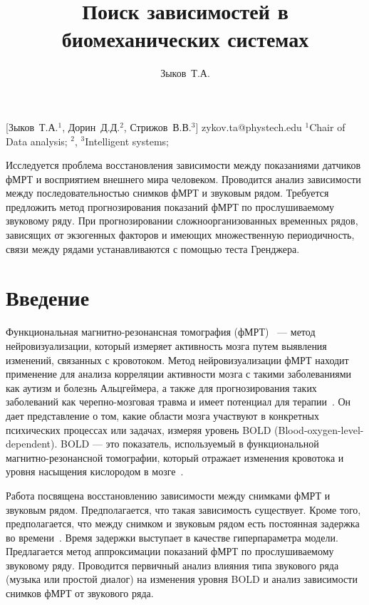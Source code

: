 \documentclass[12pt, twoside]{article}
\begin{document}
\title
    [Поиск зависимостей в биомеханических системах] %
    {Поиск зависимостей в биомеханических системах}
\author
    [Зыков Т.А.] %
    {Зыков~Т.А.} %
    [Зыков~Т.А.$^1$, Дорин~Д.Д.$^2$, Стрижов~В.В.$^{3}$] %
\email
    {zykov.ta@phystech.edu}
\organization
    {$^1$Chair of Data analysis; $^2$, $^3$Intelligent systems;}
\abstract
    {%

    
   Исследуется проблема восстановления зависимости между показаниями датчиков фМРТ и восприятием внешнего мира человеком. Проводится анализ зависимости между последовательностью снимков фМРТ и звуковым рядом. Требуется предложить метод прогнозирования показаний фМРТ по прослушиваемому звуковому ряду. При прогнозировании сложноорганизованных временных рядов, зависящих от экзогенных факторов и имеющих множественную периодичность, связи между рядами устанавливаются с помощью теста Гренджера. 
}
\maketitle

\section{Введение}

Функциональная магнитно-резонансная томография (фМРТ)~\citep{puras2014neurovisualization} — метод нейровизуализации, который измеряет активность мозга путем выявления изменений, связанных с кровотоком. Метод нейровизуализации фМРТ находит применение для анализа корреляции активности мозга с такими заболеваниями как аутизм и болезнь Альцгеймера, а также для прогнозирования таких заболеваний как черепно-мозговая травма и имеет потенциал для терапии~\citep{fmriapplications}. Он дает представление о том, какие области мозга участвуют в конкретных психических процессах или задачах, измеряя уровень BOLD (Blood-oxygen-level-dependent). BOLD --- это показатель, используемый в функциональной магнитно-резонансной томографии, который отражает изменения кровотока и уровня насыщения кислородом в мозге~\citep{bold}. 

Работа посвящена восстановлению зависимости между снимками фМРТ
и звуковым рядом. Предполагается, что такая зависимость существует. Кроме того, предполагается, что между снимком и звуковым рядом есть постоянная задержка во
времени~\citep{menon1999spatial}. Время задержки выступает в качестве гиперпараметра модели. Предлагается метод аппроксимации показаний фМРТ по прослушиваемому звуковому ряду. Проводится первичный анализ влияния типа звукового ряда (музыка или простой диалог) на изменения уровня BOLD и анализ зависимости снимков фМРТ от звукового ряда.
\end{document}
